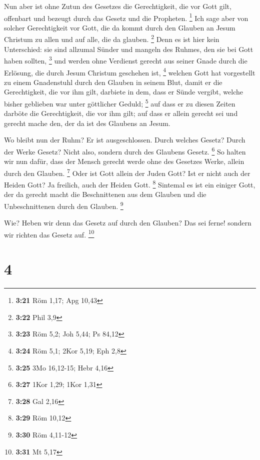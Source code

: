  Nun aber ist ohne Zutun des Gesetzes die Gerechtigkeit,
die vor Gott gilt, offenbart und bezeugt durch das Gesetz und die
Propheten. \footnote{\textbf{3:21} Röm 1,17; Apg 10,43} 
Ich sage aber von solcher Gerechtigkeit vor Gott, die da kommt durch den
Glauben an Jesum Christum zu allen und auf alle, die da glauben.
\footnote{\textbf{3:22} Phil 3,9}  Denn es ist hier kein
Unterschied: sie sind allzumal Sünder und mangeln des Ruhmes, den sie
bei Gott haben sollten, \footnote{\textbf{3:23} Röm 5,2; Joh 5,44; Ps
  84,12}  und werden ohne Verdienst gerecht aus seiner
Gnade durch die Erlösung, die durch Jesum Christum geschehen ist,
\footnote{\textbf{3:24} Röm 5,1; 2Kor 5,19; Eph 2,8} 
welchen Gott hat vorgestellt zu einem Gnadenstuhl durch den Glauben in
seinem Blut, damit er die Gerechtigkeit, die vor ihm gilt, darbiete in
dem, dass er Sünde vergibt, welche bisher geblieben war unter göttlicher
Geduld; \footnote{\textbf{3:25} 3Mo 16,12-15; Hebr 4,16} 
auf dass er zu diesen Zeiten darböte die Gerechtigkeit, die vor ihm
gilt; auf dass er allein gerecht sei und gerecht mache den, der da ist
des Glaubens an Jesum.

 Wo bleibt nun der Ruhm? Er ist ausgeschlossen. Durch
welches Gesetz? Durch der Werke Gesetz? Nicht also, sondern durch des
Glaubens Gesetz. \footnote{\textbf{3:27} 1Kor 1,29; 1Kor 1,31}
 So halten wir nun dafür, dass der Mensch gerecht werde
ohne des Gesetzes Werke, allein durch den Glauben. \footnote{\textbf{3:28}
  Gal 2,16}  Oder ist Gott allein der Juden Gott? Ist er
nicht auch der Heiden Gott? Ja freilich, auch der Heiden Gott.
\footnote{\textbf{3:29} Röm 10,12}  Sintemal es ist ein
einiger Gott, der da gerecht macht die Beschnittenen aus dem Glauben und
die Unbeschnittenen durch den Glauben. \footnote{\textbf{3:30} Röm
  4,11-12}

 Wie? Heben wir denn das Gesetz auf durch den Glauben?
Das sei ferne! sondern wir richten das Gesetz auf. \footnote{\textbf{3:31}
  Mt 5,17}

\hypertarget{section-1}{%
\section{4}\label{section-1}}

